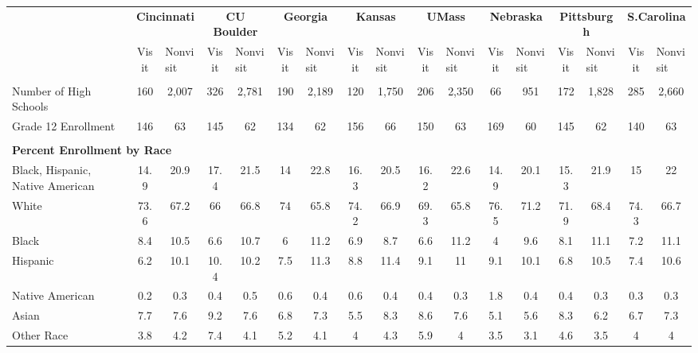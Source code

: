 \begin{tabular*}{\linewidth}{@{\extracolsep{\fill} } lcccccccccccccccc}%
&\multicolumn{2}{c}{\bfseries Cincinnati}&\multicolumn{2}{c}{\bfseries CU Boulder}&\multicolumn{2}{c}{\bfseries Georgia}&\multicolumn{2}{c}{\bfseries Kansas}&\multicolumn{2}{c}{\bfseries UMass}&\multicolumn{2}{c}{\bfseries Nebraska}&\multicolumn{2}{c}{\bfseries Pittsburgh}&\multicolumn{2}{c}{\bfseries S.Carolina}\\%
&Visit&\multicolumn{1}{l}{Nonvisit}&Visit&\multicolumn{1}{l}{Nonvisit}&Visit&\multicolumn{1}{l}{Nonvisit}&Visit&\multicolumn{1}{l}{Nonvisit}&Visit&\multicolumn{1}{l}{Nonvisit}&Visit&\multicolumn{1}{l}{Nonvisit}&Visit&\multicolumn{1}{l}{Nonvisit}&Visit&\multicolumn{1}{l}{Nonvisit}\\%
\hline%
&&&&&&&&&&&&&&&&\\%
\hspace{0cm}Number of High Schools&160&2,007&326&2,781&190&2,189&120&1,750&206&2,350&66&951&172&1,828&285&2,660\\%
\hspace{0cm}Grade 12 Enrollment&146&63&145&62&134&62&156&66&150&63&169&60&145&62&140&63\\%
&&&&&&&&&&&&&&&&\\%
\multicolumn{17}{l}{\bfseries Percent Enrollment by Race}\\%
\hspace{0.2cm}Black, Hispanic, Native American&14.9&20.9&17.4&21.5&14&22.8&16.3&20.5&16.2&22.6&14.9&20.1&15.3&21.9&15&22\\%
\hspace{0.2cm}White&73.6&67.2&66&66.8&74&65.8&74.2&66.9&69.3&65.8&76.5&71.2&71.9&68.4&74.3&66.7\\%
\hspace{0.2cm}Black&8.4&10.5&6.6&10.7&6&11.2&6.9&8.7&6.6&11.2&4&9.6&8.1&11.1&7.2&11.1\\%
\hspace{0.2cm}Hispanic&6.2&10.1&10.4&10.2&7.5&11.3&8.8&11.4&9.1&11&9.1&10.1&6.8&10.5&7.4&10.6\\%
\hspace{0.2cm}Native American&0.2&0.3&0.4&0.5&0.6&0.4&0.6&0.4&0.4&0.3&1.8&0.4&0.4&0.3&0.3&0.3\\%
\hspace{0.2cm}Asian&7.7&7.6&9.2&7.6&6.8&7.3&5.5&8.3&8.6&7.6&5.1&5.6&8.3&6.2&6.7&7.3\\%
\hspace{0.2cm}Other Race&3.8&4.2&7.4&4.1&5.2&4.1&4&4.3&5.9&4&3.5&3.1&4.6&3.5&4&4\\%

\end{tabular*}
